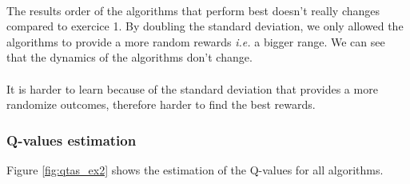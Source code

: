 \documentclass[letterpaper]{article}
\begin{document}
\paragraph{}

The results order of the algorithms that perform best doesn't really changes
compared to exercice 1.
By doubling the standard deviation, we only allowed the algorithms to
provide a more random rewards \textit{i.e.} a bigger range. We can see
that the dynamics of the algorithms don't change.

\paragraph{}

It is harder to learn because of the standard deviation that provides
a more randomize outcomes, therefore harder to find the best rewards.


\subsubsection{Q-values estimation}


Figure \ref{fig:qtas_ex2}
shows the estimation of the Q-values for all algorithms.
\end{document}
